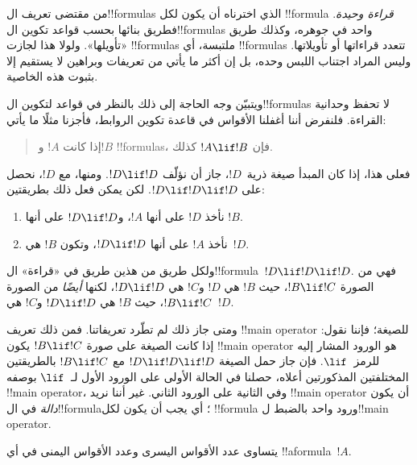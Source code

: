 \documentclass[../../../include/open-logic-section]{subfiles}
\begin{document}


\begin{explain}
من مقتضى تعريف ال!!{formula}s الذي اخترناه أن يكون لكل !!{formula}
\emph{قراءة وحيدة}. فطريق بنائها بحسب قواعد تكوين ال!!{formula}s
واحد في جوهره، وكذلك طريق «تأويلها». ولولا هذا لجازت
!!{formula}s ملتبسة، أي !!{formula}s تتعدد قراءاتها أو تأويلاتها.
وليس المراد اجتناب اللبس وحده، بل إن أكثر ما يأتي من تعريفات
وبراهين لا يستقيم إلا بثبوت هذه الخاصية.

ويتبيّن وجه الحاجة إلى ذلك بالنظر في قواعد لتكوين ال!!{formula}s
لا تحفظ وحدانية القراءة. فلنفرض أننا أغفلنا الأقواس في قاعدة
تكوين الروابط، فأجزنا مثلًا ما يأتي:
\begin{quote}
إذا كانت $!A$ و$!B$ !!{formula}s، فإن $!A \lif !B$ كذلك.
\end{quote}
فعلى هذا، إذا كان المبدأ صيغة ذرية~$!D$، جاز أن نؤلّف $!D
\lif !D$. ومنها، مع $!D$، نحصل على $!D \lif !D
\lif !D$. لكن يمكن فعل ذلك بطريقتين:
\begin{enumerate}
\item نأخذ $!D$ على أنها $!A$، و$!D \lif !D$ على أنها $!B$.
\item نأخذ $!A$ على أنها $!D \lif !D$، وتكون $!B$ هي~$!D$.
\end{enumerate}
ولكل طريق من هذين طريق في «قراءة» ال!!{formula}~$!D \lif !D \lif
!D$. فهي من الصورة $!B \lif !C$، حيث $!B$ هي $!D$ و$!C$ هي $!D
\lif !D$، لكنها \emph{أيضًا} من الصورة $!B \lif !C$، حيث $!B$ هي
$!D \lif !D$ و$!C$ هي~$!D$.

ومتى جاز ذلك لم تطّرد تعريفاتنا. فمن ذلك تعريف
!!{main operator} للصيغة؛ فإننا نقول: إذا كانت الصيغة على صورة $!B \lif !C$ يكون
!!{main operator} هو الورود المشار إليه للرمز~$\lif$. فإن
جاز حمل الصيغة $!D \lif !D \lif !D$ مع $!B \lif !C$
بالطريقتين المختلفتين المذكورتين أعلاه، حصلنا في الحالة الأولى على
الورود الأول لـ~$\lif$ بوصفه !!{main operator}، وفي الثانية على
الورود الثاني. غير أننا نريد !!{main operator} أن يكون
\emph{دالة} في ال!!{formula}؛ أي يجب أن يكون لكل !!{formula} ورود
واحد بالضبط ل!!{main operator}.
\end{explain}

\begin{lem}
يتساوى عدد الأقواس اليسرى وعدد الأقواس اليمنى في أي
!!a{formula}~$!A$.
\end{lem}
\end{document}
